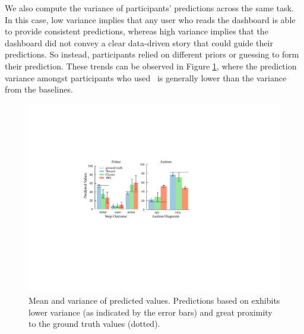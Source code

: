 \par We also compute the variance of participants' predictions across the same task. In this case, low variance implies that any user who reads the dashboard is able to provide consistent predictions, whereas high variance implies that the dashboard did not convey a clear data-driven story that could guide their predictions. So instead, participants relied on different priors or guessing to form their prediction. These trends can be observed in Figure \ref{fig:actual_predictions}, where the prediction variance amongst participants who used \system\ is generally lower than the variance from the baselines.
\begin{figure}[h!]
\centering
\includegraphics[width=0.8\linewidth]{figures/prediction.pdf}
\caption{Mean and variance of predicted values. Predictions based on \system exhibits lower variance (as indicated by the error bars) and great proximity to the ground truth values (dotted).}
\label{fig:actual_predictions}
\end{figure}